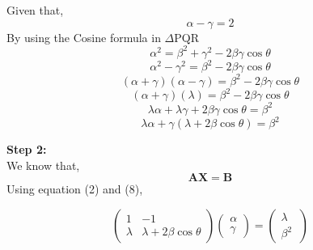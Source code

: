 \documentclass[10pt,a4paper]{article}
\let\vec\mathbf
\begin{document}
\begin{multicols}{2}
{\begin{center}
\end{center}
\vspace{3mm} 
Given that,
\begin{equation}
	\alpha-\gamma=2
\end{equation}
By using the Cosine formula in  $\Delta$PQR \\ 
\begin{equation}
\alpha^2=\beta^2+\gamma^2-2\beta\gamma\cos\theta 
\end{equation}
\vspace{1mm}
\begin{equation}
\alpha^2-\gamma^2=\beta^2-2\beta\gamma\cos\theta
\end{equation}
\vspace{1mm}
\begin{equation}
(\alpha+\gamma)(\alpha-\gamma)=\beta^2-2\beta\gamma\cos\theta
\end{equation}
\vspace{1mm}
\begin{equation}
(\alpha+\gamma)(\lambda)=\beta^2-2\beta\gamma\cos\theta
\end{equation}
\vspace{1mm}
\begin{equation}
\lambda\alpha +\lambda \gamma +2\beta\gamma\cos\theta=\beta^2
\end{equation}
\vspace{1mm}
\begin{equation}
\lambda \alpha +\gamma(\lambda+2\beta\cos\theta)=\beta^2
\end{equation}
\vspace{1mm}


\textbf{Step 2:}\vspace{2mm}\\
We know that,\\
\begin{equation}
\vec{A  X = B}
\end{equation}
Using equation (2) and (8),


\begin{equation}
  \begin{pmatrix}
1 & -1\\
\lambda & \lambda+2\beta\cos\theta
\end{pmatrix} 
\begin{pmatrix}
\alpha\\
\gamma
\end{pmatrix} 
=
\begin{pmatrix}
\lambda\\ 
 \beta^2\
\end{pmatrix}
\end{equation}\vspace{2mm}\\
 
}
\end{multicols}
\end{document}
